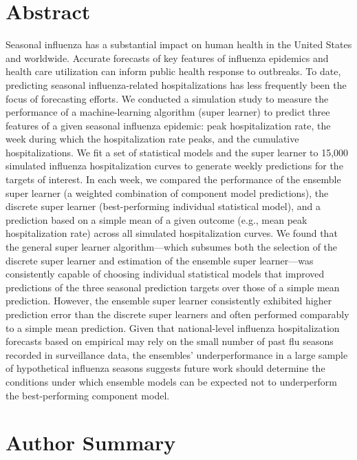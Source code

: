 \documentclass[10pt,letterpaper]{article}
\begin{document}
\hypertarget{abstract}{%
\section{Abstract}\label{abstract}}

Seasonal influenza has a substantial impact on human health in the
United States and worldwide. Accurate forecasts of key features of
influenza epidemics and health care utilization can inform public health
response to outbreaks. To date, predicting seasonal influenza-related
hospitalizations has less frequently been the focus of forecasting
efforts. We conducted a simulation study to measure the performance of a
machine-learning algorithm (super learner) to predict three features of
a given seasonal influenza epidemic: peak hospitalization rate, the week
during which the hospitalization rate peaks, and the cumulative
hospitalizations. We fit a set of statistical models and the super
learner to 15,000 simulated influenza hospitalization curves to generate
weekly predictions for the targets of interest. In each week, we
compared the performance of the ensemble super learner (a weighted
combination of component model predictions), the discrete super learner
(best-performing individual statistical model), and a prediction based
on a simple mean of a given outcome (e.g., mean peak hospitalization
rate) across all simulated hospitalization curves. We found that the
general super learner algorithm---which subsumes both the selection of
the discrete super learner and estimation of the ensemble super
learner---was consistently capable of choosing individual statistical
models that improved predictions of the three seasonal prediction
targets over those of a simple mean prediction. However, the ensemble
super learner consistently exhibited higher prediction error than the
discrete super learners and often performed comparably to a simple mean
prediction. Given that national-level influenza hospitalization
forecasts based on empirical may rely on the small number of past flu
seasons recorded in surveillance data, the ensembles' underperformance
in a large sample of hypothetical influenza seasons suggests future work
should determine the conditions under which ensemble models can be
expected not to underperform the best-performing component model.

\hypertarget{author-summary}{%
\section{Author Summary}\label{author-summary}}
\end{document}
